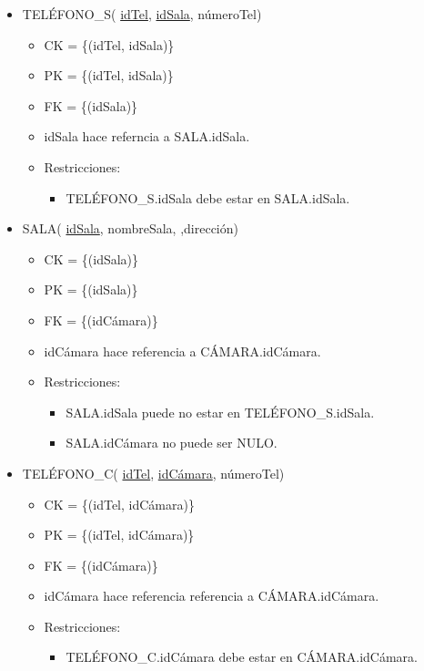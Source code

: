 \begin{itemize}
\item TELÉFONO\_S( \underline{idTel}, \underline{idSala}, númeroTel) 
	\begin{itemize}
		\item CK = \{(idTel, idSala)\}
		\item PK = \{(idTel, idSala)\}
		\item FK = \{(idSala)\}
		\item idSala hace referncia a SALA.idSala.
		\item Restricciones:
			\begin{itemize}
			\item TELÉFONO\_S.idSala debe estar en  SALA.idSala.
			\\
			\end{itemize}
	\end{itemize}


\item SALA( \underline{idSala}, nombreSala, ,dirección)
	\begin{itemize}
		\item CK = \{(idSala)\}
		\item PK = \{(idSala)\}
		\item FK = \{(idCámara)\}
		\item idCámara hace referencia a CÁMARA.idCámara.
		\item Restricciones:
			\begin{itemize}
			\item SALA.idSala puede no estar en TELÉFONO\_S.idSala.
			\item SALA.idCámara no puede ser NULO.
			\\
			\end{itemize}
	\end{itemize}
	
	
\item TELÉFONO\_C( \underline{idTel}, \underline{idCámara}, númeroTel) 
	\begin{itemize}
		\item CK = \{(idTel, idCámara)\}
		\item PK = \{(idTel, idCámara)\}
		\item FK = \{(idCámara)\}
		\item idCámara hace referencia referencia a CÁMARA.idCámara.
		\item Restricciones:
			\begin{itemize}
			\item TELÉFONO\_C.idCámara debe estar en CÁMARA.idCámara.
			\\
			\end{itemize}
	\end{itemize}



\end{itemize}
